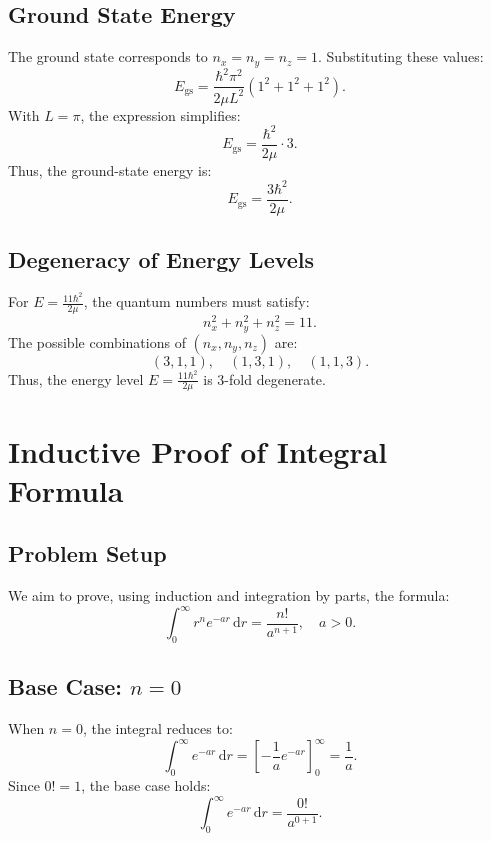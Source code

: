 \documentclass[a4paper,12pt]{article}
\begin{document}
\begin{multicols}{2}
\subsection*{Ground State Energy}
The ground state corresponds to \( n_x = n_y = n_z = 1 \). Substituting these values:
\[
E_\text{gs} = \frac{\hbar^2 \pi^2}{2\mu L^2} \left(1^2 + 1^2 + 1^2\right).
\]
With \( L = \pi \), the expression simplifies:
\[
E_\text{gs} = \frac{\hbar^2}{2\mu} \cdot 3.
\]
Thus, the ground-state energy is:
\[
E_\text{gs} = \frac{3\hbar^2}{2\mu}.
\]

\subsection*{Degeneracy of Energy Levels}
For \( E = \frac{11\hbar^2}{2\mu} \), the quantum numbers must satisfy:
\[
n_x^2 + n_y^2 + n_z^2 = 11.
\]
The possible combinations of \( (n_x, n_y, n_z) \) are:
\[
(3, 1, 1), \quad (1, 3, 1), \quad (1, 1, 3).
\]
Thus, the energy level \( E = \frac{11\hbar^2}{2\mu} \) is 3-fold degenerate.

\section*{Inductive Proof of Integral Formula}
\subsection*{Problem Setup}
We aim to prove, using induction and integration by parts, the formula:
\[
\int_0^\infty r^n e^{-ar} \, \mathrm{d}r = \frac{n!}{a^{n+1}}, \quad a > 0.
\]

\subsection*{Base Case: \( n = 0 \)}
When \( n = 0 \), the integral reduces to:
\[
\int_0^\infty e^{-ar} \, \mathrm{d}r = \left[-\frac{1}{a} e^{-ar} \right]_0^\infty = \frac{1}{a}.
\]
Since \( 0! = 1 \), the base case holds:
\[
\int_0^\infty e^{-ar} \, \mathrm{d}r = \frac{0!}{a^{0+1}}.
\]


\end{multicols}
\end{document}
